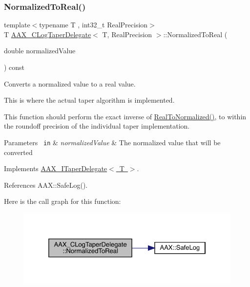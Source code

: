 \subsubsection{\texorpdfstring{NormalizedToReal()}{NormalizedToReal()}}
{\footnotesize\ttfamily template$<$typename T , int32\+\_\+t Real\+Precision$>$ \\
T \mbox{\hyperlink{a01497}{A\+A\+X\+\_\+\+C\+Log\+Taper\+Delegate}}$<$ T, Real\+Precision $>$\+::Normalized\+To\+Real (\begin{DoxyParamCaption}\item[{double}]{normalized\+Value }\end{DoxyParamCaption}) const\hspace{0.3cm}{\ttfamily [virtual]}}



Converts a normalized value to a real value. 

This is where the actual taper algorithm is implemented.

This function should perform the exact inverse of \mbox{\hyperlink{a01497_abcc5e51eebe04ff347de512a103880de}{Real\+To\+Normalized()}}, to within the roundoff precision of the individual taper implementation.


\begin{DoxyParams}[1]{Parameters}
\mbox{\texttt{ in}}  & {\em normalized\+Value} & The normalized value that will be converted \\
\hline
\end{DoxyParams}


Implements \mbox{\hyperlink{a01881_a0aea0765b42855205bfab84673a2de33}{A\+A\+X\+\_\+\+I\+Taper\+Delegate$<$ T $>$}}.



References A\+A\+X\+::\+Safe\+Log().

Here is the call graph for this function\+:
\nopagebreak
\begin{figure}[H]
\begin{center}
\leavevmode
\includegraphics[width=325pt]{a01497_a363e09fe8517d4a5ecb151483f011752_cgraph}
\end{center}
\end{figure}
\mbox{\label{a01497_abcc5e51eebe04ff347de512a103880de}} 
